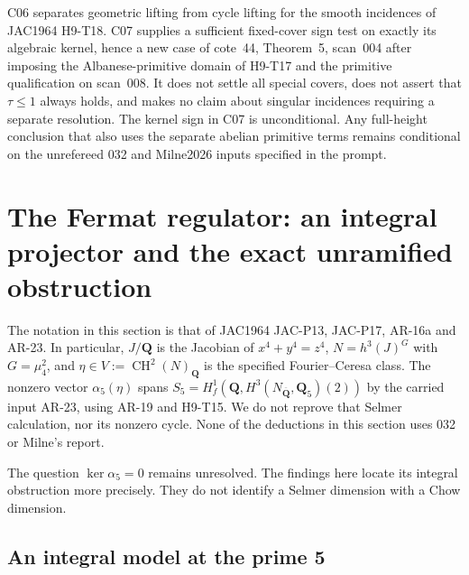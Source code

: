 \documentclass[11pt]{article}
\theoremstyle{remark}\newtheorem{remark}[theorem]{Remark}
\begin{document}
C06 separates geometric lifting from cycle lifting
for the smooth incidences of JAC1964 H9-T18.
C07 supplies a sufficient fixed-cover sign test on
exactly its algebraic kernel, hence a new case of
cote~44, Theorem~5, scan~004 after imposing the
Albanese-primitive domain of H9-T17 and the primitive
qualification on scan~008. It does not settle all
special covers, does not assert that $\tau\le1$
always holds, and makes no claim about singular
incidences requiring a separate resolution.
The kernel sign in C07 is unconditional. Any full-height
conclusion that also uses the separate abelian primitive
terms remains conditional on the unrefereed 032 and
Milne2026 inputs specified in the prompt.



\section{The Fermat regulator: an integral projector and the exact
unramified obstruction}

The notation in this section is that of JAC1964 JAC-P13, JAC-P17,
AR-16a and AR-23.  In particular, $J/\mathbf Q$ is the Jacobian of
$x^4+y^4=z^4$, $N=h^3(J)^G$ with $G=\mu_4^2$, and
$\eta\in V:=\operatorname{CH}^2(N)_{\mathbf Q}$ is the specified
Fourier--Ceresa class.  The nonzero vector
$\alpha_5(\eta)$ spans
$S_5=H^1_f(\mathbf Q,H^3(N_{\overline{\mathbf Q}},\mathbf Q_5)(2))$
by the carried input AR-23, using AR-19 and H9-T15.  We do not reprove
that Selmer calculation, nor its nonzero cycle.  None of the deductions
in this section uses 032 or Milne's report.

The question $\ker\alpha_5=0$ remains unresolved.  The findings here
locate its integral obstruction more precisely.  They do not identify
a Selmer dimension with a Chow dimension.

\subsection{An integral model at the prime 5}
\end{document}
